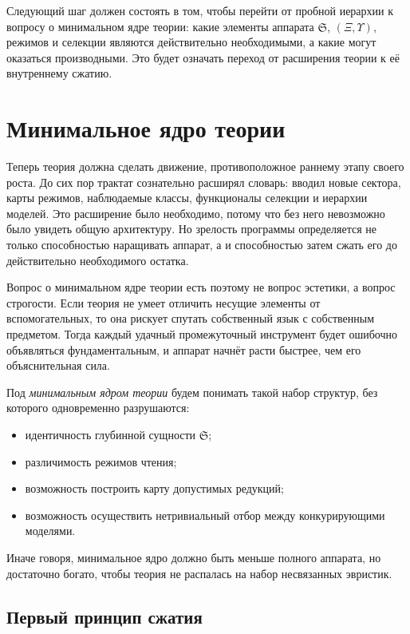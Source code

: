 \documentclass[12pt,a4paper]{article}
\begin{document}
Следующий шаг должен состоять в том, чтобы перейти от пробной иерархии к вопросу о минимальном ядре теории: какие элементы аппарата \(\mathfrak{S}\), \((\Xi,\Upsilon)\), режимов и селекции являются действительно необходимыми, а какие могут оказаться производными. Это будет означать переход от расширения теории к её внутреннему сжатию.

\section{Минимальное ядро теории}

Теперь теория должна сделать движение, противоположное раннему этапу своего роста. До сих пор трактат сознательно расширял словарь: вводил новые сектора, карты режимов, наблюдаемые классы, функционалы селекции и иерархии моделей. Это расширение было необходимо, потому что без него невозможно было увидеть общую архитектуру. Но зрелость программы определяется не только способностью наращивать аппарат, а и способностью затем сжать его до действительно необходимого остатка.

Вопрос о минимальном ядре теории есть поэтому не вопрос эстетики, а вопрос строгости. Если теория не умеет отличить несущие элементы от вспомогательных, то она рискует спутать собственный язык с собственным предметом. Тогда каждый удачный промежуточный инструмент будет ошибочно объявляться фундаментальным, и аппарат начнёт расти быстрее, чем его объяснительная сила.

Под \textit{минимальным ядром теории} будем понимать такой набор структур, без которого одновременно разрушаются:
\begin{itemize}
    \item идентичность глубинной сущности \(\mathfrak{S}\);
    \item различимость режимов чтения;
    \item возможность построить карту допустимых редукций;
    \item возможность осуществить нетривиальный отбор между конкурирующими моделями.
\end{itemize}

Иначе говоря, минимальное ядро должно быть меньше полного аппарата, но достаточно богато, чтобы теория не распалась на набор несвязанных эвристик.

\subsection{Первый принцип сжатия}
\end{document}
